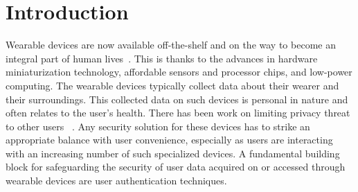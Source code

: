 \section{Introduction}\label{sec:intro}

Wearable devices are now available off-the-shelf and on the way to become an integral part of human
lives~\cite{googleglass,smartwatch,fitbit}.  This is thanks to the advances in hardware miniaturization technology, affordable
sensors and processor chips, and low-power computing.
The wearable devices typically collect data about their wearer and their 
surroundings. This collected data on such devices is personal in nature and 
often relates to the user's health. There has been work on limiting privacy 
threat to other users 
~\cite{hoyle2015sensitive,hoyle2014privacy,jana2013scanner}.
Any security solution for these devices has to strike an 
appropriate balance with user convenience, especially as users are interacting 
with an increasing number of such specialized devices. A fundamental building 
block for safeguarding the security of user data acquired on or accessed 
through wearable devices are user authentication techniques.%

